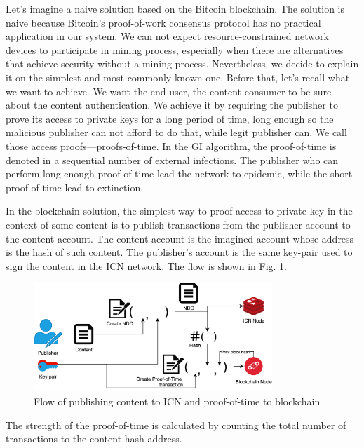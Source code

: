 Let's imagine a naive solution based on the Bitcoin blockchain. The solution is naive because Bitcoin's proof-of-work consensus protocol has no practical application in our system. We can not expect resource-constrained network devices to participate in mining process, especially when there are alternatives that achieve security without a mining process. Nevertheless, we decide to explain it on the simplest and most commonly known one. 
Before that, let's recall what we want to achieve. We want the end-user, the content consumer to be sure about the content authentication. We achieve it by requiring the publisher to prove its access to private keys for a long period of time, long enough so the malicious publisher can not afford to do that, while legit publisher can. We call those access proofs––proofs-of-time. In the GI algorithm, the proof-of-time is denoted in a sequential number of external infections. The publisher who can perform long enough proof-of-time lead the network to epidemic, while the short proof-of-time lead to extinction. 

In the blockchain solution, the simplest way to proof access to private-key in the context of some content is to publish transactions from the publisher account to the content account. The content account is the imagined account whose address is the hash of such content. The publisher's account is the same key-pair used to sign the content in the ICN network. The flow is shown in Fig. \ref{fig:distribution-flow}.
\begin{figure}[h!]
\includegraphics[width=9cm]{img/distribution-flow.png}
\centering
\caption{Flow of publishing content to ICN and proof-of-time to blockchain}
\label{fig:distribution-flow}
\end{figure} 
The strength of the proof-of-time is calculated by counting the total number of transactions to the content hash address. 

